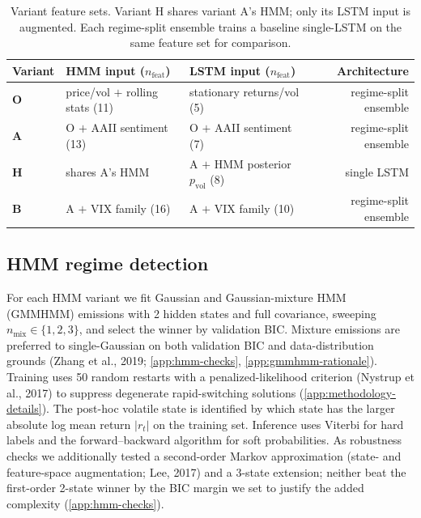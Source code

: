 \documentclass{article}
\begin{document}
  \begin{table}[H]
\centering
\caption{Variant feature sets. Variant H shares variant A's HMM; only its LSTM input is augmented. Each regime-split ensemble trains a baseline single-LSTM on the same feature set for comparison.}
\label{tab:variants}
\small
\begin{tabular}{@{}lp{4.6cm}p{4.6cm}r@{}}
\toprule
Variant & HMM input ($n_{\text{feat}}$) & LSTM input ($n_{\text{feat}}$) & Architecture \\
\midrule
\textbf{O} & price/vol $+$ rolling stats (11) & stationary returns/vol (5)              & regime-split ensemble \\
\textbf{A} & O $+$ AAII sentiment (13)         & O $+$ AAII sentiment (7)                  & regime-split ensemble \\
\textbf{H} & shares A's HMM                    & A $+$ HMM posterior $p_{\text{vol}}$ (8)  & single LSTM \\
\textbf{B} & A $+$ VIX family (16)             & A $+$ VIX family (10)                     & regime-split ensemble \\
\bottomrule
\end{tabular}
\end{table}

\subsection{HMM regime detection}

  For each HMM variant we fit Gaussian and Gaussian-mixture HMM (GMMHMM) emissions with 2 hidden states and full covariance, sweeping $n_{\text{mix}} \in \{1, 2, 3\}$, and select the winner by
  validation BIC. Mixture emissions are preferred to single-Gaussian on both validation BIC and data-distribution grounds (Zhang et al., 2019; \cref{app:hmm-checks}, \cref{app:gmmhmm-rationale}). Training uses 50 random restarts with a penalized-likelihood criterion (Nystrup et al., 2017) to suppress degenerate rapid-switching solutions (\cref{app:methodology-details}). The post-hoc volatile state is identified by which state has the larger
  absolute log mean return $|r_t|$ on the training set. Inference uses Viterbi for hard labels and the forward--backward algorithm for soft probabilities. As robustness checks we additionally tested a second-order Markov approximation (state- and feature-space augmentation; Lee, 2017) and a 3-state extension; neither beat the first-order 2-state winner by the BIC margin we set to justify the added complexity (\cref{app:hmm-checks}).
\end{document}
